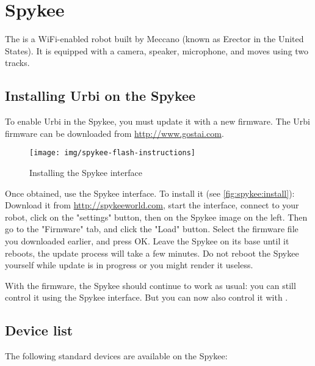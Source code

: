 
\chapter{Spykee}
\label{sec:spykee}

The  is a WiFi-enabled robot built by Meccano (known as
Erector in the United States). It is equipped with a camera, speaker,
microphone, and moves using two tracks.

\section{Installing Urbi on the Spykee}

To enable Urbi in the Spykee, you must update it with a new firmware. The Urbi
firmware can be downloaded from \url{http://www.gostai.com}.

\begin{figure}[htp]
  \centering
  \texttt{[image: img/spykee-flash-instructions]}
  \caption{Installing the Spykee interface}
  \label{fig:spykee:install}
\end{figure}

Once obtained, use the Spykee interface.  To install it (see
\autoref{fig:spykee:install}): Download it from
\url{http://spykeeworld.com}, start the interface, connect to your robot,
click on the "settings" button, then on the Spykee image on the left.  Then
go to the "Firmware" tab, and click the "Load" button. Select the firmware
file you downloaded earlier, and press OK. Leave the Spykee on its base
until it reboots, the update process will take a few minutes. Do not reboot
the Spykee yourself while update is in progress or you might render it
useless.

With the \urbi firmware, the Spykee should continue to work as usual: you
can still control it using the Spykee interface. But you can now also
control it with \urbi.


\section{Device list}

The following standard devices are available on the Spykee:


